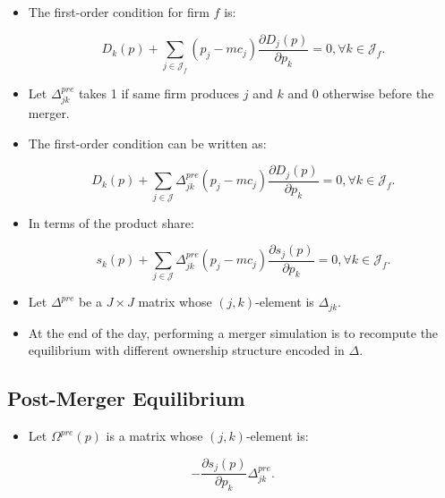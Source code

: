 \documentclass[]{book}
\providecommand{\tightlist}{%
  \setlength{\itemsep}{0pt}\setlength{\parskip}{0pt}}
\begin{document}
\begin{itemize}
\tightlist
\item
  The first-order condition for firm \(f\) is:

  \begin{equation}
  D_k(p) + \sum_{j \in \mathcal{J}_f} (p_j - mc_j) \frac{\partial D_j(p)}{\partial p_k} = 0, \forall k \in \mathcal{J}_f.
  \end{equation}
\item
  Let \(\Delta_{jk}^{pre}\) takes 1 if same firm produces \(j\) and
  \(k\) and 0 otherwise before the merger.
\item
  The first-order condition can be written as:

  \begin{equation}
  D_k(p) + \sum_{j \in \mathcal{J}} \Delta_{jk}^{pre}(p_j - mc_j) \frac{\partial D_j(p)}{\partial p_k} = 0, \forall k \in \mathcal{J}_f.
  \end{equation}
\item
  In terms of the product share:

  \begin{equation}
  s_k(p) + \sum_{j \in \mathcal{J}} \Delta_{jk}^{pre}(p_j - mc_j) \frac{\partial s_j(p)}{\partial p_k} = 0, \forall k \in \mathcal{J}_f.
  \end{equation}
\item
  Let \(\Delta^{pre}\) be a \(J \times J\) matrix whose
  \((j, k)\)-element is \(\Delta_{jk}\).
\item
  At the end of the day, performing a merger simulation is to recompute
  the equilibrium with different ownership structure encoded in
  \(\Delta\).
\end{itemize}

\subsection{Post-Merger Equilibrium}\label{post-merger-equilibrium}

\begin{itemize}
\tightlist
\item
  Let \(\Omega^{pre}(p)\) is a matrix whose \((j, k)\)-element is:
\end{itemize}

\begin{equation}
- \frac{\partial s_{j}(p)}{\partial p_k} \Delta_{jk}^{pre}.
\end{equation}
\end{document}
